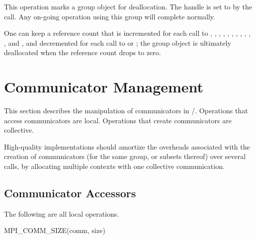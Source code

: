 This operation marks a group object for deallocation. The handle
 is set to  by the call.
Any on-going operation using this group will complete normally.

\begin{implementors}
\begin{sloppy}
  One can keep a reference count that is incremented for each call to
  , ,
  , , ,
  \vlgb{}, , ,
  , ,
  , and  , \gb{}and
  decremented for each call to  or
  ; the group object is ultimately deallocated when the
  reference count drops to zero.
\end{sloppy}
\end{implementors}

\section{Communicator Management}
\label{sec:context:comm-management}

This section describes the manipulation of communicators in \MPI/.
Operations that access communicators are local.
Operations that create communicators are collective.

\begin{implementors}
High-quality implementations should
amortize the overheads associated with the creation
of communicators (for the same group, or subsets thereof)
over several calls, by allocating multiple contexts with one
collective communication.
\end{implementors}

\subsection{Communicator Accessors}
\label{subsec:context-intracommacc}

The following are all local operations.

%
\begin{funcdef}{MPI\_COMM\_SIZE}{(\mbox{comm}, \mbox{size})}
\end{funcdef}

